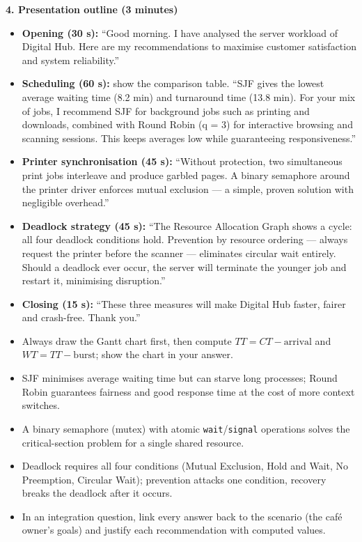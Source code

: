 \documentclass[11pt]{article}
\begin{document}
\textbf{4. Presentation outline (3 minutes)}\par
\begin{itemize}
    \item \textbf{Opening (30 s):} ``Good morning. I have analysed the server workload of Digital Hub. Here are my recommendations to maximise customer satisfaction and system reliability.''
    \item \textbf{Scheduling (60 s):} show the comparison table. ``SJF gives the lowest average waiting time (8.2 min) and turnaround time (13.8 min). For your mix of jobs, I recommend SJF for background jobs such as printing and downloads, combined with Round Robin (q = 3) for interactive browsing and scanning sessions. This keeps averages low while guaranteeing responsiveness.''
    \item \textbf{Printer synchronisation (45 s):} ``Without protection, two simultaneous print jobs interleave and produce garbled pages. A binary semaphore around the printer driver enforces mutual exclusion — a simple, proven solution with negligible overhead.''
    \item \textbf{Deadlock strategy (45 s):} ``The Resource Allocation Graph shows a cycle: all four deadlock conditions hold. Prevention by resource ordering — always request the printer before the scanner — eliminates circular wait entirely. Should a deadlock ever occur, the server will terminate the younger job and restart it, minimising disruption.''
    \item \textbf{Closing (15 s):} ``These three measures will make Digital Hub faster, fairer and crash-free. Thank you.''
\end{itemize}

\begin{aretenir}
\begin{itemize}
    \item Always draw the Gantt chart first, then compute $TT = CT - \text{arrival}$ and $WT = TT - \text{burst}$; show the chart in your answer.
    \item SJF minimises average waiting time but can starve long processes; Round Robin guarantees fairness and good response time at the cost of more context switches.
    \item A binary semaphore (mutex) with atomic \texttt{wait}/\texttt{signal} operations solves the critical-section problem for a single shared resource.
    \item Deadlock requires all four conditions (Mutual Exclusion, Hold and Wait, No Preemption, Circular Wait); prevention attacks one condition, recovery breaks the deadlock after it occurs.
    \item In an integration question, link every answer back to the scenario (the café owner's goals) and justify each recommendation with computed values.
\end{itemize}
\end{aretenir}
\end{document}
